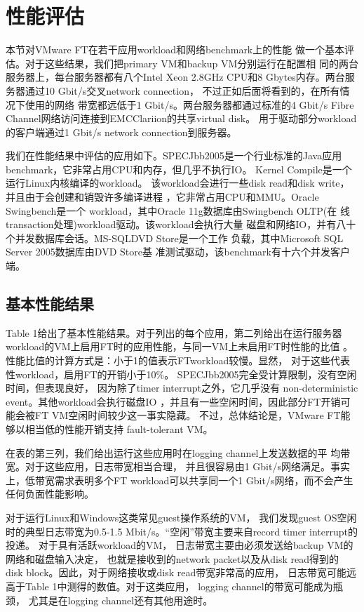 \section{性能评估}

本节对VMware FT在若干应用workload和网络benchmark上的性能%
做一个基本评估。对于这些结果，我们把primary VM和backup VM分别运行在配置相%
同的两台服务器上，每台服务器都有八个Intel Xeon 2.8GHz CPU和8 %
Gbytes内存。两台服务器通过10 Gbit/s交叉network connection，%
不过正如后面将看到的，在所有情况下使用的网络%
带宽都远低于1 Gbit/s。两台服务器都通过标准的4 Gbit/s %
Fibre Channel网络访问连接到EMCClariion的共享virtual disk。%
用于驱动部分workload的客户端通过1 Gbit/s network connection到服务器。%

我们在性能结果中评估的应用如下。SPECJbb2005是一个行业标准的Java应用%
benchmark，它非常占用CPU和内存，但几乎不执行IO。%
Kernel Compile是一个运行Linux内核编译的workload。%
该workload会进行一些disk read和disk write，并且由于会创建和销毁许多编译进程%
，它非常占用CPU和MMU。Oracle Swingbench是一个%
workload，其中Oracle 11g数据库由Swingbench OLTP(在%
线transaction处理)workload驱动。该workload会执行大量%
磁盘和网络IO，并有八十个并发数据库会话。MS-SQLDVD Store是一个工作%
负载，其中Microsoft SQL Server 2005数据库由DVD Store基%
准测试驱动，该benchmark有十六个并发客户端。

\subsection{基本性能结果}

\inserttableone

Table 1给出了基本性能结果。对于列出的每个应用，第二列给出在运行服务器%
workload的VM上启用FT时的应用性能，与同一VM上未启用FT时性能的比值%
。性能比值的计算方式是：小于1的值表示FTworkload较慢。显然，%
对于这些代表性workload，启用FT的开销小于10\%。%
SPECJbb2005完全受计算限制，没有空闲时间，但表现良好，%
因为除了timer interrupt之外，它几乎没有%
non-deterministic event。其他workload会执行磁盘IO%
，并且有一些空闲时间，因此部分FT开销可能会被FT VM空闲时间较少这一事实隐藏。%
不过，总体结论是，VMware FT能够以相当低的性能开销支持%
fault-tolerant VM。%

在表的第三列，我们给出运行这些应用时在logging channel上发送数据的平%
均带宽。对于这些应用，日志带宽相当合理，%
并且很容易由1 Gbit/s网络满足。事实上，低带宽需求表明多个FT %
workload可以共享同一个1 Gbit/s网络，而不会产生任何负面性能影响。%

对于运行Linux和Windows这类常见guest操作系统的VM，%
我们发现guest OS空闲时的典型日志带宽为0.5-1.5 %
Mbit/s。“空闲”带宽主要来自record timer interrupt的投递。%
对于具有活跃workload的VM，%
日志带宽主要由必须发送给backup VM的网络和磁盘输入决定，%
也就是接收到的network packet以及从disk read得到的%
disk block。因此，对于网络接收或disk read带宽非常高的应用，%
日志带宽可能远高于Table 1中测得的数值。对于这类应用，%
logging channel的带宽可能成为瓶颈，%
尤其是在logging channel还有其他用途时。%

